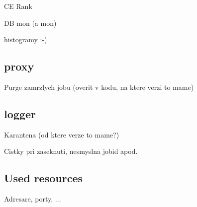 CE Rank

DB mon (a mon)

histogramy :-)

\subsection{\LB proxy}

Purge zamrzlych jobu (overit v kodu, na ktere verzi to mame)

\subsection{\LB logger}

Karantena (od ktere verze to mame?)

Cistky pri zaseknuti, nesmyslna jobid apod.

\subsection{Used resources}

Adresare, porty, ...
